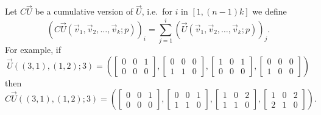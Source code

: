 \label{def:CU}Let $C\vec U$ be a cumulative version of $\vec U$, i.e.~for $i$ in $[1,(n-1)k]$ we define
$$\left( C\vec U(\vec v_1, \vec v_2, \ldots, \vec v_k; p)\right)_i
=
\sum_{j=1}^{i}\left(
\vec U(\vec v_1, \vec v_2, \ldots, \vec v_k; p) \right)_j.
$$
For example, if
$$\vec U((3,1), (1,2); 3) = \left(
\begin{bmatrix}
0 & 0 & 1 \\
0 & 0 & 0
\end{bmatrix},
\begin{bmatrix}
0 & 0 & 0 \\
1 & 1 & 0 
\end{bmatrix},
\begin{bmatrix}
1 & 0 & 1 \\
0 & 0 & 0
\end{bmatrix},
\begin{bmatrix}
0 & 0 & 0 \\
1 & 0 & 0
\end{bmatrix}
\right)$$
then
$$C\vec U((3,1), (1,2); 3) = \left(
\begin{bmatrix}
0 & 0 & 1 \\
0 & 0 & 0
\end{bmatrix},
\begin{bmatrix}
0 & 0 & 1 \\
1 & 1 & 0 
\end{bmatrix},
\begin{bmatrix}
1 & 0 & 2 \\
1 & 1 & 0
\end{bmatrix},
\begin{bmatrix}
1 & 0 & 2 \\
2 & 1 & 0
\end{bmatrix}
\right).$$

